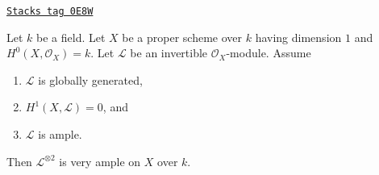 \begin{lemma}
\label{curves-lemma-criterion-very-ample-bis}
\href{https://stacks.math.columbia.edu/tag/0E8W}{\texttt{Stacks tag 0E8W}}

Let $k$ be a field. Let $X$ be a proper scheme over $k$ having dimension $1$
and $H^0(X, \mathcal{O}_X) = k$. Let $\mathcal{L}$ be an invertible
$\mathcal{O}_X$-module. Assume
\begin{enumerate}
\item $\mathcal{L}$ is globally generated,
\item $H^1(X, \mathcal{L}) = 0$, and
\item $\mathcal{L}$ is ample.
\end{enumerate}
Then $\mathcal{L}^{\otimes 2}$ is very ample on $X$ over $k$.
\end{lemma}

